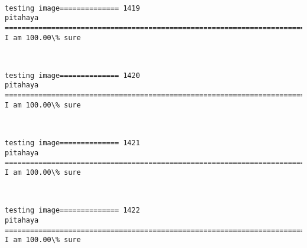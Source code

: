 \documentclass[11pt]{article}
\begin{document}
    \begin{center}
    \end{center}
    { \hspace*{\fill} \\}
    
    \begin{Verbatim}[commandchars=\\\{\}]
testing image============== 1419
pitahaya
============================================================================
I am 100.00\% sure

    \end{Verbatim}

    \begin{center}
    \end{center}
    { \hspace*{\fill} \\}
    
    \begin{Verbatim}[commandchars=\\\{\}]
testing image============== 1420
pitahaya
============================================================================
I am 100.00\% sure

    \end{Verbatim}

    \begin{center}
    \end{center}
    { \hspace*{\fill} \\}
    
    \begin{Verbatim}[commandchars=\\\{\}]
testing image============== 1421
pitahaya
============================================================================
I am 100.00\% sure

    \end{Verbatim}

    \begin{center}
    \end{center}
    { \hspace*{\fill} \\}
    
    \begin{Verbatim}[commandchars=\\\{\}]
testing image============== 1422
pitahaya
============================================================================
I am 100.00\% sure

    \end{Verbatim}
\end{document}
